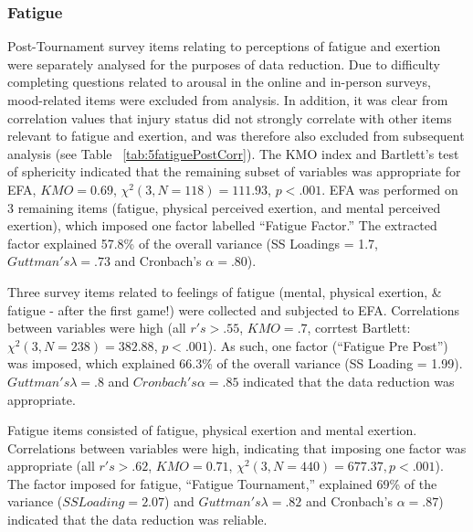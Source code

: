 {\begin{landscape}
\end{landscape}
\restoregeometry








\subsubsection{Fatigue \label{app8:fatigueEFA}}

Post-Tournament survey items relating to perceptions of fatigue and exertion were separately analysed for the purposes of data reduction.  Due to difficulty completing questions related to arousal in the online and in-person surveys, mood-related items were excluded from analysis.  In addition, it was clear from correlation values that injury status did not strongly correlate with other items relevant to fatigue and exertion, and was therefore also excluded from subsequent analysis (see Table ~\ref{tab:5fatiguePostCorr}).  The KMO index and Bartlett's test of sphericity indicated that the remaining subset of variables was appropriate for EFA, $KMO =  0.69$, $\chi^2(3, N = 118) = 111.93$, $p < .001$. EFA was performed on 3 remaining items (fatigue, physical perceived exertion, and mental perceived exertion), which imposed one factor labelled ``Fatigue Factor.''  The extracted factor explained 57.8\% of the overall variance (SS Loadings = 1.7, $Guttman's\lambda =.73$ and Cronbach's $\alpha = .80$).

Three survey items related to feelings of fatigue (mental, physical exertion, & fatigue - after the first game!)  were collected and subjected to EFA.
Correlations between variables were high (all $r's > .55$, $KMO = .7$, corrtest Bartlett: $\chi^2(3, N = 238) = 382.88$, $p < .001$).  As such, one factor (``Fatigue Pre Post'') was imposed, which explained 66.3\% of the overall variance (SS Loading = 1.99).  $Guttman's \lambda =.8$ and $Cronbach's \alpha = .85$ indicated that the data reduction was appropriate.

Fatigue items consisted of fatigue, physical exertion and mental exertion. Correlations between variables were high, indicating that imposing one factor was appropriate (all $r's > .62$, $KMO = 0.71$, $\chi^2(3, N = 440) =  677.37, p < .001$).  The factor imposed for fatigue, ``Fatigue Tournament,'' explained 69\% of the variance ($SS Loading = 2.07$) and $Guttman's \lambda =.82$ and Cronbach's $\alpha = .87$) indicated that the data reduction was reliable.


}

